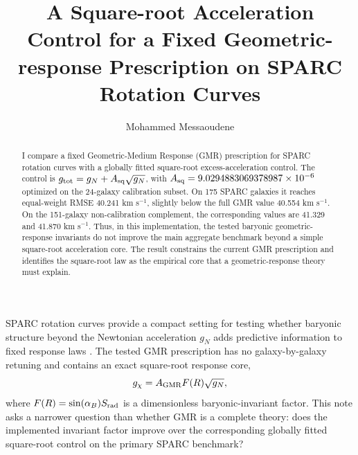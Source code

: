 \documentclass[RNAAS]{aastex701}
\begin{document}
\pagestyle{plain}

\title{A Square-root Acceleration Control for a Fixed Geometric-response Prescription on SPARC Rotation Curves}

\author{Mohammed Messaoudene}

\begin{abstract}
I compare a fixed Geometric-Medium Response (GMR) prescription for SPARC rotation curves with a globally fitted square-root excess-acceleration control. The control is $g_{\rm tot}=g_N+A_{\rm sq}\sqrt{g_N}$, with $A_{\rm sq}=9.0294883069378987\times10^{-6}$ optimized on the 24-galaxy calibration subset. On 175 SPARC galaxies it reaches equal-weight RMSE 40.241 km s$^{-1}$, slightly below the full GMR value 40.554 km s$^{-1}$. On the 151-galaxy non-calibration complement, the corresponding values are 41.329 and 41.870 km s$^{-1}$. Thus, in this implementation, the tested baryonic geometric-response invariants do not improve the main aggregate benchmark beyond a simple square-root acceleration core. The result constrains the current GMR prescription and identifies the square-root law as the empirical core that a geometric-response theory must explain.
\end{abstract}


\maketitle
\pagestyle{plain}
\thispagestyle{plain}

SPARC rotation curves provide a compact setting for testing whether baryonic structure beyond the Newtonian acceleration $g_N$ adds predictive information to fixed response laws \citep{lelli2016,mcgaugh2016}. The tested GMR prescription has no galaxy-by-galaxy retuning and contains an exact square-root response core,
\begin{equation}
g_\chi = A_{\rm GMR}F(R)\sqrt{g_N},
\end{equation}
where $F(R)=\sin(\alpha_B)S_{\rm rad}$ is a dimensionless baryonic-invariant factor. This note asks a narrower question than whether GMR is a complete theory: does the implemented invariant factor improve over the corresponding globally fitted square-root control on the primary SPARC benchmark?
\end{document}
